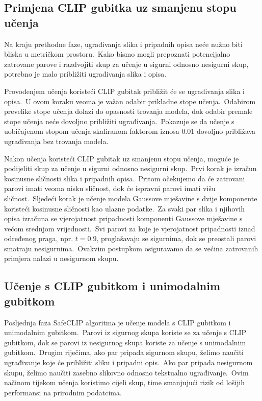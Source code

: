 \documentclass[times, utf8, seminar, numeric]{fer}
\begin{document}
\subsection{Primjena CLIP gubitka uz smanjenu stopu učenja}

Na kraju prethodne faze, ugrađivanja slika i pripadnih opisa neće nužno biti bliska u metričkom prostoru.\ 
Kako bismo mogli prepoznati potencijalno zatrovane parove i razdvojiti skup za učenje u sigurni odnosno nesigurni skup, potrebno je malo približiti ugrađivanja slika i opisa.\
  
Provođenjem učenja koristeći CLIP gubitak približit će se ugrađivanja slika i opisa.\ 
U ovom koraku veoma je važan odabir prikladne stope učenja.\ Odabirom prevelike stope učenja dolazi do opasnosti trovanja modela, dok odabir premale stope učenja neće dovoljno približiti ugrađivanja.\ 
Pokazuje se da učenje s uobičajenom stopom učenja skaliranom faktorom iznosa $0.01$ dovoljno približava ugrađivanja bez trovanja modela.\
  
Nakon učenja koristeći CLIP gubitak uz smanjenu stopu učenja, moguće je podijeliti skup za učenje u sigurni odnosno nesigurni skup.\ 
Prvi korak je izračun kosinusne sličnosti slika i pripadnih opisa.\ Pritom očekujemo da će zatrovani parovi imati veoma nisku sličnost, dok će ispravni parovi imati višu sličnost.\ 
Sljedeći korak je učenje modela Gaussove mješavine s dvije komponente koristeći kosinusne sličnosti kao ulazne podatke.\ Za svaki par slika i njihovih opisa izračuna se vjerojatnost pripadnosti komponenti Gaussove mješavine s većom srednjom vrijednosti.\ 
Svi parovi za koje je vjerojatnost pripadnosti iznad određenog praga, npr. $t = 0.9$, proglašavaju se sigurnima, dok se preostali parovi smatraju nesigurnima.\ 
Ovakvim postupkom osiguravamo da se većina zatrovanih primjera nalazi u nesigurnom skupu.\ 

\subsection{Učenje s CLIP gubitkom i unimodalnim gubitkom}

Posljednja faza SafeCLIP algoritma je učenje modela s CLIP gubitkom i unimodalnim gubitkom.\ 
Parovi iz sigurnog skupa koriste se za učenje s CLIP gubitkom, dok se parovi iz nesigurnog skupa koriste za učenje s unimodalnim gubitkom.\ 
Drugim riječima, ako par pripada sigurnom skupu, želimo naučiti ugrađivanje koje će približiti sliku i pripadni opis.\ 
Ako par pripada nesigurnom skupu, želimo naučiti zasebno slikovno odnosno tekstualno ugrađivanje.\ Ovim načinom tijekom učenja koristimo cijeli skup, time smanjujući rizik od lošijih performansi na prirodnim podatcima.\ 
  
\end{document}
